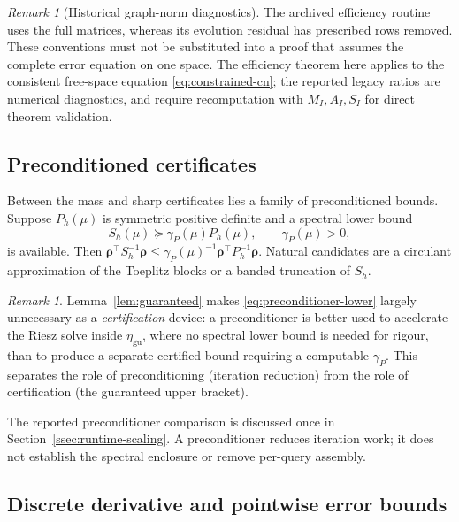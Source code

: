 \documentclass[11pt]{amsart}
\theoremstyle{remark}
\newtheorem{remark}[theorem]{Remark}
\newcommand{\Sh}{S_h}
\newcommand{\etaGuar}{\eta_{\mathrm{gu}}}
\newcommand{\rr}{\bm\rho}
\begin{document}
\begin{remark}[Historical graph-norm diagnostics]
The archived efficiency routine uses the full matrices, whereas its
evolution residual has prescribed rows removed. These conventions must not
be substituted into a proof that assumes the complete error equation on
one space. The efficiency theorem here applies to the consistent free-space
equation \eqref{eq:constrained-cn}; the reported legacy ratios are numerical
diagnostics, and require recomputation with $M_I,A_I,S_I$ for direct
theorem validation.
\end{remark}

\subsection{Preconditioned certificates}
\label{ssec:preconditioned}

Between the mass and sharp certificates lies a family of preconditioned
bounds.  Suppose $P_h(\mu)$ is symmetric positive definite and a spectral
lower bound
\begin{equation}
  \Sh(\mu)\succeq\gamma_P(\mu)P_h(\mu),\qquad\gamma_P(\mu)>0,
  \label{eq:preconditioner-lower}
\end{equation}
is available.  Then
$\rr^\top\Sh^{-1}\rr\le\gamma_P(\mu)^{-1}\rr^\top P_h^{-1}\rr$.  Natural
candidates are a circulant approximation of the Toeplitz blocks or a banded
truncation of $\Sh$.

\begin{remark}
Lemma~\ref{lem:guaranteed} makes \eqref{eq:preconditioner-lower} largely
unnecessary as a \emph{certification} device: a preconditioner is better used
to accelerate the Riesz solve inside $\etaGuar$, where no spectral lower bound
is needed for rigour, than to produce a separate certified bound requiring a
computable $\gamma_P$.  This separates the role of preconditioning (iteration reduction) from the
role of certification (the guaranteed upper bracket).
\end{remark}

The reported preconditioner comparison is discussed once in
Section~\ref{ssec:runtime-scaling}. A preconditioner reduces iteration work;
it does not establish the spectral enclosure or remove per-query assembly.

\subsection{Discrete derivative and pointwise error bounds}
\label{ssec:greeks-cert}
\end{document}
